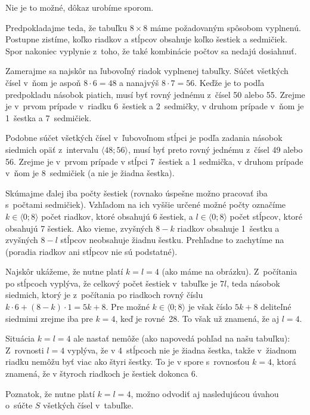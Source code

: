 {%
Nie je to možné, dôkaz urobíme sporom.

Predpokladajme teda, že tabuľku $8\times 8$ máme požadovaným spôsobom
vyplnenú. Postupne zistíme, koľko riadkov a stĺpcov obsahuje koľko
šestiek a sedmičiek. Spor nakoniec vyplynie z~toho, že také
kombinácie počtov sa nedajú dosiahnuť.

Zamerajme sa najskôr na ľubovoľný riadok vyplnenej tabuľky.
Súčet všetkých čísel v~ňom je aspoň $8\cdot 6=48$ a nanajvýš
$8\cdot 7=56$. Keďže je to podľa predpokladu násobok piatich,
musí byť rovný jednému z~čísel 50 alebo 55. Zrejme je
v~prvom prípade v~riadku 6~šestiek a 2~sedmičky, v druhom
prípade v~ňom je 1~šestka a 7~sedmičiek.

Podobne súčet všetkých čísel v~ľubovoľnom stĺpci je podľa zadania
násobok siedmich opäť z~intervalu $\langle48;56\rangle$,
musí byť preto rovný jednému z~čísel 49 alebo 56. Zrejme je
v~prvom prípade v stĺpci 7~šestiek a 1 sedmička, v druhom
prípade v~ňom je 8~sedmičiek (a nie je žiadna
šestka).

Skúmajme ďalej iba počty šestiek (rovnako úspešne možno pracovať
iba s~počtami sedmičiek). Vzhľadom na ich vyššie určené možné
počty označíme $k\in\langle0;8\rangle$ počet riadkov,
ktoré obsahujú 6 šestiek, a $l\in\langle 0;8\rangle$ počet stĺpcov,
ktoré obsahujú 7 šestiek. Ako vieme, zvyšných $8-k$ riadkov obsahuje 1~šestku
a zvyšných $8-l$ stĺpcov neobsahuje žiadnu šestku. Prehľadne to zachytíme
na \obr{} (poradia riadkov ani stĺpcov nie sú podstatné).
%

Najskôr ukážeme, že nutne platí $k=l=4$ (ako máme na obrázku).
Z~počítania po stĺpcoch vyplýva, že celkový počet šestiek v~tabuľke
je $7l$, teda násobok siedmich, ktorý je z~počítania po riadkoch rovný číslu
$k\cdot6+(8-k)\cdot1=5k+8$. Pre možné $k\in\langle0;8\rangle$
je však číslo $5k+8$ deliteľné siedmimi zrejme iba pre $k=4$,
keď je rovné~28. To však už znamená, že aj $l=4$.

Situácia $k=l=4$ ale nastať nemôže (ako napovedá pohľad na našu
tabuľku): Z~rovnosti $l=4$ vyplýva, že v 4~stĺpcoch nie je žiadna šestka,
takže v~žiadnom riadku nemôžu byť viac ako štyri šestky.
To je v spore s~rovnosťou $k=4$, ktorá znamená,
že v štyroch riadkoch je šestiek dokonca 6.

\poznamka
Poznatok, že nutne platí $k=l=4$, možno odvodiť aj nasledujúcou
úvahou o~súčte $S$ všetkých čísel v~tabuľke.

}
